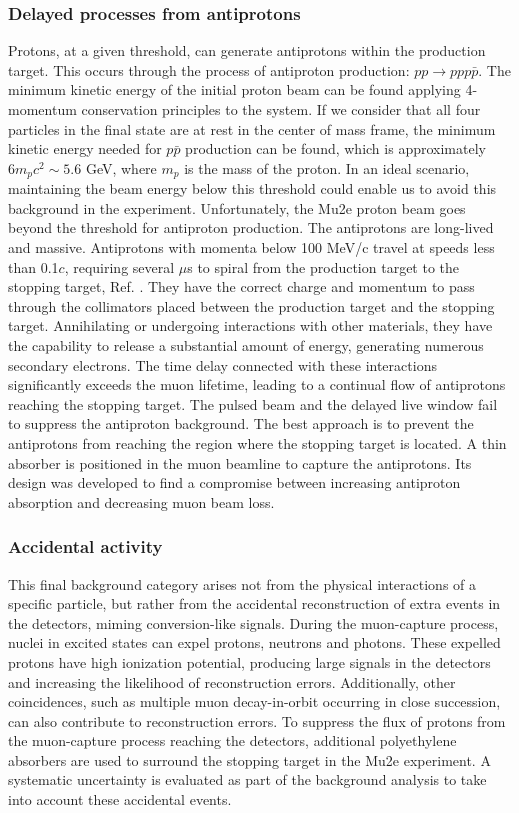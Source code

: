 \subsubsection{Delayed processes from antiprotons}
Protons, at a given threshold, can generate antiprotons within the production target. This occurs through the process of antiproton production: $pp \rightarrow ppp\bar{p}$. The minimum kinetic energy of the initial proton beam can be found applying 4-momentum conservation principles to the system. 
If we consider that all four particles in the final state are at rest in the center of mass frame, the minimum kinetic energy needed for $p\bar{p}$ production can be found, which is approximately $6 m_pc^2 \sim 5.6$ GeV, where $m_p$ is the mass of the proton. In an ideal scenario, maintaining the beam energy below this threshold could enable us to avoid this background in the experiment. Unfortunately, the Mu2e proton beam goes beyond the threshold for antiproton production. The antiprotons are long-lived and massive. Antiprotons with momenta below 100 MeV/c travel at speeds less than 0.1$c$, requiring several $\mu$s to spiral from the production target to the stopping target, Ref. \cite{bartoszek2015mu2e}. They have the correct charge and momentum to pass through the collimators placed between the production target and the stopping target. Annihilating or undergoing interactions with other materials, they have the capability to release a substantial amount of energy, generating numerous secondary electrons. The time delay connected with these interactions significantly exceeds the muon lifetime, leading to a continual flow of antiprotons reaching the stopping target. The pulsed beam and the delayed live window fail to suppress the antiproton background. The best approach is to prevent the antiprotons from reaching the region where the stopping target is located. A thin absorber is positioned in the muon beamline to capture the antiprotons. Its design was developed to find a compromise between increasing antiproton absorption and decreasing muon beam loss.
\subsubsection{Accidental activity}
This final background category arises not from the physical interactions of a specific particle, but rather from the accidental reconstruction of extra events in the detectors, miming conversion-like signals. During the muon-capture process, nuclei in excited states can expel protons, neutrons and photons. These expelled protons have high ionization potential, producing large signals in the detectors and increasing the likelihood of reconstruction errors. Additionally, other coincidences, such as multiple muon decay-in-orbit occurring in close succession, can also contribute to reconstruction errors. To suppress the flux of protons from the muon-capture process reaching the detectors, additional polyethylene absorbers are used to surround the stopping target in the Mu2e experiment. A systematic uncertainty is evaluated as part of the background analysis to take into account these accidental events.

